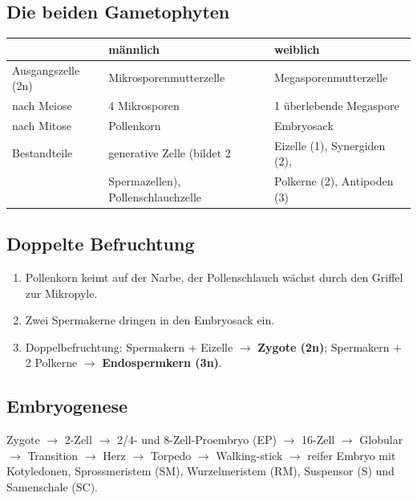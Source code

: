 
\subsection*{Die beiden Gametophyten}\label{subsec:die-beiden-gametophyten}
\begin{mytable}
    \begin{tabular}{@{}| l | l | l |@{}}
    \hline
    & \textbf{männlich} & \textbf{weiblich} \\
    \hline
    Ausgangszelle (2n) & Mikrosporenmutterzelle & Megasporenmutterzelle \\
    nach Meiose & 4 Mikrosporen & 1 überlebende Megaspore \\
    nach Mitose & Pollenkorn & Embryosack \\
    Bestandteile & generative Zelle (bildet 2 & Eizelle (1), Synergiden (2), \\
    & Spermazellen), Pollenschlauchzelle & Polkerne (2), Antipoden (3) \\
    \hline
\end{tabular}
\end{mytable}


\subsection*{Doppelte Befruchtung}\label{subsec:doppelte-befruchtung}
\begin{enumerate}
    \item Pollenkorn keimt auf der Narbe, der Pollenschlauch wächst durch den Griffel zur Mikropyle.
    \item Zwei Spermakerne dringen in den Embryosack ein.
    \item Doppelbefruchtung: Spermakern + Eizelle $\to$ \textbf{Zygote (2n)}; Spermakern + 2 Polkerne $\to$ \textbf{Endospermkern (3n)}.
\end{enumerate}


\subsection*{Embryogenese}\label{subsec:embryogenese}
Zygote $\to$ 2-Zell $\to$ 2/4- und 8-Zell-Proembryo (EP) $\to$ 16-Zell $\to$ Globular $\to$ Transition $\to$ Herz $\to$ Torpedo $\to$ Walking-stick $\to$ reifer Embryo mit Kotyledonen, Sprossmeristem (SM), Wurzelmeristem (RM), Suspensor (S) und Samenschale (SC).

